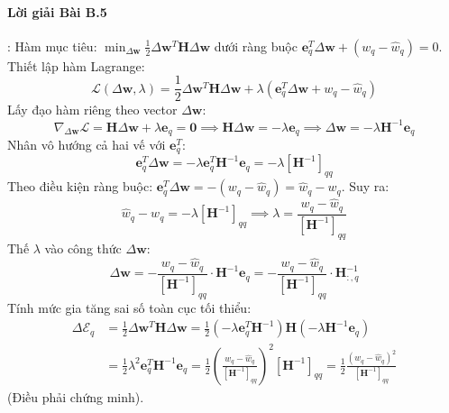 \paragraph{Lời giải Bài B.5}:
Hàm mục tiêu: $\min_{\Delta \mathbf{w}} \frac{1}{2} \Delta \mathbf{w}^T \mathbf{H} \Delta \mathbf{w}$ dưới ràng buộc $\mathbf{e}_q^T \Delta \mathbf{w} + (w_q - \hat{w}_q) = 0$.
Thiết lập hàm Lagrange:
\begin{equation*}
\mathcal{L}(\Delta \mathbf{w}, \lambda) = \frac{1}{2} \Delta \mathbf{w}^T \mathbf{H} \Delta \mathbf{w} + \lambda \left(\mathbf{e}_q^T \Delta \mathbf{w} + w_q - \hat{w}_q\right)
\end{equation*}
Lấy đạo hàm riêng theo vector $\Delta \mathbf{w}$:
\begin{equation*}
\nabla_{\Delta \mathbf{w}} \mathcal{L} = \mathbf{H} \Delta \mathbf{w} + \lambda \mathbf{e}_q = \mathbf{0} \implies \mathbf{H} \Delta \mathbf{w} = -\lambda \mathbf{e}_q \implies \Delta \mathbf{w} = -\lambda \mathbf{H}^{-1} \mathbf{e}_q
\end{equation*}
Nhân vô hướng cả hai vế với $\mathbf{e}_q^T$:
\begin{equation*}
\mathbf{e}_q^T \Delta \mathbf{w} = -\lambda \mathbf{e}_q^T \mathbf{H}^{-1} \mathbf{e}_q = -\lambda [\mathbf{H}^{-1}]_{qq}
\end{equation*}
Theo điều kiện ràng buộc: $\mathbf{e}_q^T \Delta \mathbf{w} = -(w_q - \hat{w}_q) = \hat{w}_q - w_q$. Suy ra:
\begin{equation*}
\hat{w}_q - w_q = -\lambda [\mathbf{H}^{-1}]_{qq} \implies \lambda = \frac{w_q - \hat{w}_q}{[\mathbf{H}^{-1}]_{qq}}
\end{equation*}
Thế $\lambda$ vào công thức $\Delta \mathbf{w}$:
\begin{equation*}
\Delta \mathbf{w} = - \frac{w_q - \hat{w}_q}{[\mathbf{H}^{-1}]_{qq}} \cdot \mathbf{H}^{-1} \mathbf{e}_q = - \frac{w_q - \hat{w}_q}{[\mathbf{H}^{-1}]_{qq}} \cdot \mathbf{H}^{-1}_{:, q}
\end{equation*}
Tính mức gia tăng sai số toàn cục tối thiểu:
\begin{align*}
\Delta \mathcal{E}_q &= \frac{1}{2} \Delta \mathbf{w}^T \mathbf{H} \Delta \mathbf{w} = \frac{1}{2} \left(-\lambda \mathbf{e}_q^T \mathbf{H}^{-1}\right) \mathbf{H} \left(-\lambda \mathbf{H}^{-1} \mathbf{e}_q\right) \\
&= \frac{1}{2} \lambda^2 \mathbf{e}_q^T \mathbf{H}^{-1} \mathbf{e}_q = \frac{1}{2} \left(\frac{w_q - \hat{w}_q}{[\mathbf{H}^{-1}]_{qq}}\right)^2 [\mathbf{H}^{-1}]_{qq} = \frac{1}{2} \frac{(w_q - \hat{w}_q)^2}{[\mathbf{H}^{-1}]_{qq}}
\end{align*}
(Điều phải chứng minh).

